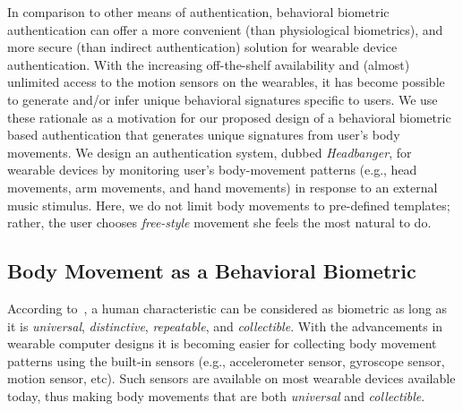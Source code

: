 In comparison to other means of authentication, behavioral biometric authentication can offer a more convenient (than physiological biometrics),
and more secure (than indirect authentication) solution for wearable device
authentication. With the increasing off-the-shelf availability and (almost) unlimited access to the motion sensors on the wearables, it
has become possible to generate and/or infer unique behavioral signatures
specific to users. We use these rationale as a motivation for our proposed
design of a behavioral biometric based authentication that generates unique
signatures from user's body movements. We design an authentication system, dubbed {\em Headbanger}, for wearable
devices by monitoring user's body-movement patterns (e.g., head movements, arm movements, and hand movements) in response to an
external music stimulus. Here, we do not limit body movements to pre-defined templates; rather, the user chooses \emph{free-style} movement she feels the most natural to do.

\subsection{Body Movement as a Behavioral Biometric}
\label{subsec:headmovements}


According to~\cite{jain2004introduction}, a human characteristic can be
considered as biometric as long as it is \emph{universal}, \emph{distinctive},
\emph{repeatable}, and \emph{collectible}. With the advancements in
wearable computer designs it is becoming easier for collecting body movement
patterns using the built-in sensors (e.g., accelerometer sensor, gyroscope sensor, motion sensor, etc). Such sensors are
available on most wearable devices available today, thus
making body movements that are both \emph{universal} and {\em collectible}.

